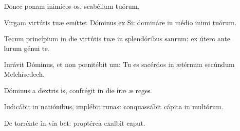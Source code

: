 \item {}

\item Donec ponam inimícos os,\psstar{} scabéllum  tuórum.

\item Virgam virtútis tuæ emíttet Dóminus ex Si:\psstar{} domináre in médio inimi tuórum.

\item Tecum princípium in die virtútis tuæ in splendóribus sanrum:\psstar{} ex útero ante lurum génui te.

\item Iurávit Dóminus, et non pœnitébit um:\psstar{} Tu es sacérdos in ætérnum secúndum  Melchísedech.

\item Dóminus a dextris is,\psstar{} confrégit in die iræ æ reges.

\item Iudicábit in natiónibus, implébit runas:\psstar{} conquassábit cápita in  multórum.

\item De torrénte in via bet:\psstar{} proptérea exalbit caput.
